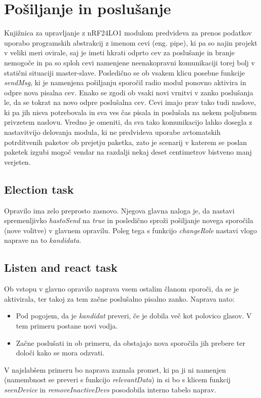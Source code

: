 \documentclass[runningheads]{llncs}
\begin{document}
\section{Pošiljanje in poslušanje}
Knjižnica za upravljanje z nRF24LO1 modulom predvideva za prenos podatkov uporabo programskih abstrakcij z imenom cevi (eng. pipe), ki pa so najin projekt v veliki meri ovirale, saj je imeti hkrati odprto cev za poslušanje in branje nemogoče in pa so sploh cevi namenjene neenakopravni komunikaciji torej bolj v statični situaciji master-slave. Posledično se ob vsakem klicu posebne funkcije \textit{sendMsg}, ki je namenjena pošiljanju sporočil radio modul ponovno aktivira in odpre nova pisalna cev. Enako se zgodi ob vsaki novi vrnitvi v zanko poslušanja le, da se tokrat na novo odpre poslušalna cev. Cevi imajo prav tako tudi naslove, ki pa jih nisva potrebovala in sva ves čas pisala in poslušala na nekem poljubnem privzetem naslovu. Vredno je omeniti, da sva tako komunikacijo lahko dosegla z nastavitvijo delovanja modula, ki ne predvideva uporabe avtomatskih potrditvenih paketov ob prejetju paketka, zato je scenarij v katerem se poslan paketek izgubi mogoč vendar na razdalji nekaj deset centimetrov bistveno manj verjeten.

\subsection{Election task}
Opravilo ima zelo preprosto zasnovo. Njegova glavna naloga je, da nastavi spremenljivko \textit{hastoSend} na \textit{true} in posledično sproži pošiljanje novega sporočila (nove volitve) v glavnem opravilu. Poleg tega s funkcijo \textit{changeRole} nastavi vlogo naprave na to \textit{kandidata}. 

\subsection{Listen and react task}
Ob vstopu v glavno opravilo naprava vsem ostalim članom sporoči, da se je aktivirala, ter takoj za tem začne poslušalno pisalno zanko. Naprava nato:

\begin{itemize}
\item Pod pogojem, da je \textit{kandidat} preveri, če je dobila več kot polovico glasov. V tem primeru postane novi vodja.
\item Začne poslušati in ob primeru, da obstajajo nova sporočila jih prebere ter določi kako se mora odzvati.
\end{itemize}
V najslabšem primeru bo naprava zaznala promet, ki pa ji ni namenjen (namembnost se preveri s funkcijo \textit{relevantData}) in si bo s klicem funkcij \textit{seenDevice} in \textit{removeInactiveDevs} posodobila interno tabelo naprav. \\
\end{document}
